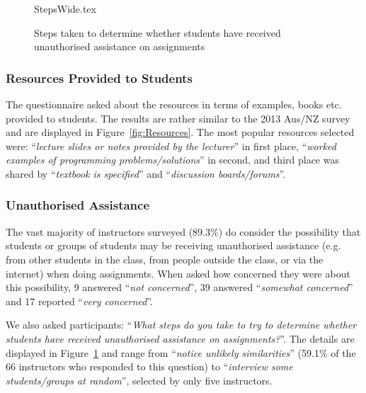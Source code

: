 \documentclass[english]{programming}
\begin{document}
\begin{figure}
\begin{center}
{StepsWide.tex}
\end{center}
\caption{Steps taken to determine whether students have received unauthorised assistance on assignments\label{fig:Plagiarise}}
\end{figure}

\subsubsection{Resources Provided to Students}

The questionnaire asked about the resources in terms of examples,
books etc. provided to students. The results are rather similar to the
2013 Aus/NZ survey~\cite[Figure 14]{mason+cooper:2014} and are
displayed in Figure~\ref{fig:Resources}. The most popular resources
selected were: ``{\emph{lecture slides or notes provided by the
lecturer}}'' in first place, ``{\emph{worked examples of programming
problems/solutions}}'' in second, and third place was shared by
``{\emph{textbook is specified}}'' and ``{\emph{discussion
boards/forums}}''.

\subsubsection{Unauthorised Assistance}

The vast majority of instructors surveyed (89.3\%) do consider the
possibility that students or groups of students may be receiving
unauthorised assistance (e.g. from other students in the class, from
people outside the class, or via the internet) when doing
assignments. When asked how concerned they were about this
possibility, 9 answered ``{\emph{not concerned}}'', 39 answered
``{\emph{somewhat concerned}}'' and 17 reported ``{\emph{very
concerned}}''.

We also asked participants: ``{\emph{What steps do you take to try to
determine whether students have received unauthorised assistance on
assignments?}}''. The details are displayed in
Figure~\ref{fig:Plagiarise} and range from ``{\emph{notice unlikely
similarities}}'' (59.1\% of the 66 instructors who responded to this
question) to ``{\emph{interview some students/groups at random}}'',
selected by only five instructors.

\end{document}
